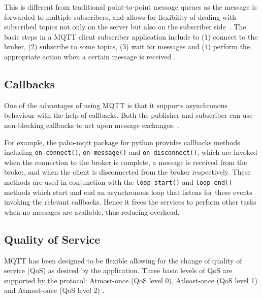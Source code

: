 This is different from traditional point-to-point message queues as
the message is forwarded to multiple subscribers, and allows for
flexibility of dealing with subscribed topics not only on the server
but also on the subscriber side~\cite{hivemq-details}. The basic steps
in a MQTT client subscriber application include to (1) connect to the broker,
(2) subscribe to some topics, (3) wait for messages and (4) perform the
appropriate action when a certain message is received
\cite{mqtt-wiki}.
 
\subsection{Callbacks}

One of the advantages of using MQTT is that it supports
asynchronous behaviour with the help of callbacks. Both the publisher
and subscriber can use non-blocking callbacks to act upon message exchanges.
\cite{hivemq-details}\cite{python-paho-mqtt}.

For example, the paho-mqtt package for python provides callbacks
methods including \verb|on-connect()|, \verb|on-message()| and
\verb|on-disconnect()|, which are invoked when the connection to the
broker is complete, a message is received from the broker, and when
the client is disconnected from the broker respectively. These methods
are used in conjunction with the \verb|loop-start()| and \verb|loop-end()| methods
which start and end an asynchronous loop that listens for these events
invoking the relevant callbacks. Hence it frees the services to perform
other tasks~\cite{python-paho-mqtt} when no messages are available,
thus reducing overhead.

\subsection{Quality of Service}

MQTT has been designed to be flexible allowing for the change of
quality of service (QoS) as desired by the application. Three basic
levels of QoS are supported by the protocol:  Atmost-once (QoS level
0), Atleast-once (QoS level 1) and Atmost-once (QoS level 2)
\cite{hivemq-qos,python-paho-mqtt}.

